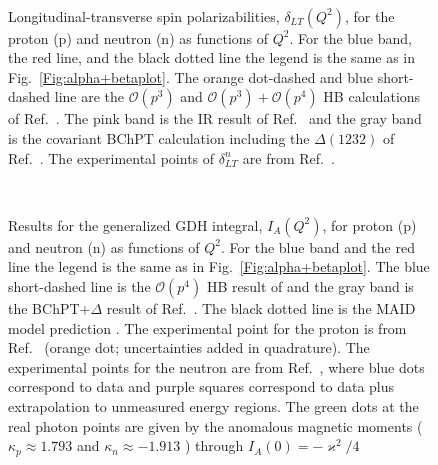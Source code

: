 \documentclass[twocolumn,prc,showpacs,nofootinbib,preprintnumbers,amsmath,amssymb,superscriptaddress]{revtex4-1}
\begin{document}
\begin{figure}[H]
\begin{center}
\hspace{-0.3cm} \\[0.5cm]\hspace{-0.3cm} 
\caption{Longitudinal-transverse spin polarizabilities, $\delta_{LT}(Q^2)$, for the proton (p) and neutron (n) as functions of $Q^2$. 
For the blue band, the red line, and the black dotted line the legend is the same as in Fig.~\ref{Fig:alpha+betaplot}. 
The orange dot-dashed and blue short-dashed line are the $\mathcal{O}(p^3)$ and $\mathcal{O}(p^3)+\mathcal{O}(p^4)$ HB calculations of Ref.~\cite{Kao:2002cp}. The pink band is the IR result of Ref.~\cite{Bernard:2002pw} and the gray band is the covariant BChPT calculation including the $\Delta(1232)$ of Ref.~\cite{Bernard:2012hb}. 
The experimental points of $\delta^n_{LT}$ are from Ref.~\cite{Amarian:2004yf}.\label{Fig:deltaLTplot}}
\end{center}
\end{figure}

\begin{figure}[H]
\begin{center}
\hspace{-0.3cm} \\[0.5cm]
\hspace{-0.3cm} 
\caption{Results for the generalized GDH integral, $I_A(Q^2)$, for proton (p) and neutron (n) as functions of $Q^2$. For the blue band and the red line the legend is the same as in Fig.~\ref{Fig:alpha+betaplot}. The blue short-dashed line is the $\mathcal{O}(p^4)$ HB result of \cite{Kao:2002cp,Kao:2003jd} and the gray band is the BChPT+$\Delta$ result of Ref.~\cite{Bernard:2012hb}. The black dotted line is the MAID model prediction \cite{MAID}. The experimental point for the proton is from Ref.~\cite{Zielinski:2017gwp} (orange dot; uncertainties added in quadrature). The experimental points for the neutron are from Ref.~\cite{Amarian:2002ar}, where blue dots correspond to data and purple squares correspond to data plus extrapolation to unmeasured energy regions. The green dots at the real photon points are given by the anomalous magnetic moments ($\kappa_p \approx 1.793$ and $\kappa_n\approx -1.913$ \cite{Mohr:2012tt}) through $I_A(0)=-\varkappa^2/4$\label{Fig:IAplot}}
\end{center}
\end{figure}
\end{document}
